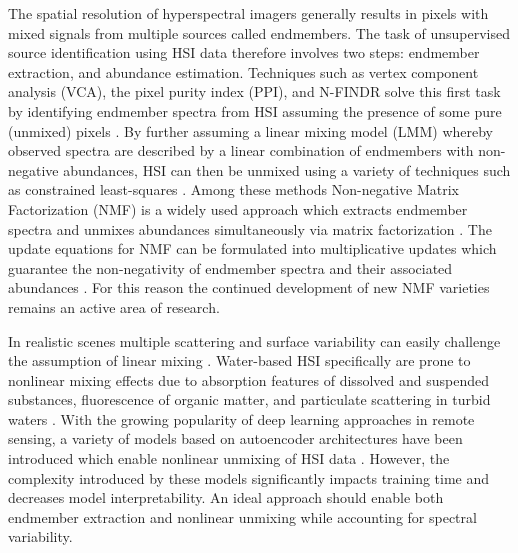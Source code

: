 \documentclass[remotesensing,article,submit,pdftex,moreauthors]{Definitions/mdpi}
\begin{document}
The spatial resolution of hyperspectral imagers generally results in  pixels with mixed signals from multiple sources called endmembers. The task of unsupervised source identification using HSI data therefore involves two steps: endmember extraction, and abundance estimation. Techniques such as vertex component analysis (VCA), the pixel purity index (PPI), and N-FINDR solve this first task by identifying endmember spectra from HSI assuming the presence of some pure (unmixed) pixels \cite{vca-orig, ppi-orig, N-FINDR-orig}. By further assuming a linear mixing model (LMM) whereby observed spectra are described by a linear combination of endmembers with non-negative abundances, HSI can then be unmixed using a variety of techniques such as constrained least-squares \cite{spectral-unmixing-orig, fcls-unmixing}. Among these methods Non-negative Matrix Factorization (NMF) is a widely used approach which extracts endmember spectra and unmixes abundances simultaneously via matrix factorization \cite{nmf-orig, unmixing-nmf-review, unmixing-nmf-review-2}. The update equations for NMF can be formulated into multiplicative updates which guarantee the non-negativity of endmember spectra and their associated abundances \cite{nmf-algorithms}.  For this reason the continued development of new NMF varieties remains an active area of research.

In realistic scenes multiple scattering and surface variability can easily challenge the assumption of linear mixing \cite{heylen2014review}. Water-based HSI specifically are prone to nonlinear mixing effects due to absorption features of dissolved and suspended substances, fluorescence of organic matter, and particulate scattering in turbid waters \cite{hsi-absorption, hsi-fluorescence, hsi-turibidity}. With the growing popularity of deep learning approaches in remote sensing, a variety of models based on autoencoder architectures have been introduced which enable nonlinear unmixing of HSI data \cite{non-negative-autoencoders,su2019daen,palsson2020convolutional,}. However, the complexity introduced by these models significantly impacts training time and decreases model interpretability. An ideal approach should enable both endmember extraction and nonlinear unmixing while accounting for spectral variability. 
\end{document}
